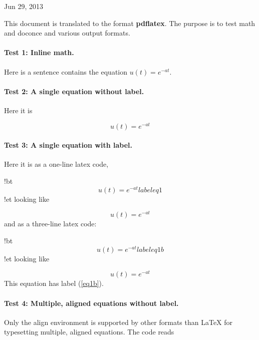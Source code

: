 \documentclass[%
oneside,                 %
final,                   %
10pt]{article}
\begin{document}
\begin{center}
Jun 29, 2013
\end{center}

\vspace{1cm}



This document is translated to the format \textbf{pdflatex}. The purpose is to
test math and doconce and various output formats.

\paragraph{Test 1: Inline math.}
Here is a sentence contains the equation $u(t)=e^{-at}$.

\paragraph{Test 2: A single equation without label.}
Here it is

\[ u(t)=e^{-at} \]

\paragraph{Test 3: A single equation with label.}
Here it is as a one-line
latex code,

\bccq
!bt
\begin{equation} u(t)=e^{-at} label{eq1}\end{equation}
!et
\eccq
looking like

\begin{equation} u(t)=e^{-at} \label{eq1}\end{equation}
and as a three-line latex code:

\bccq
!bt
\begin{equation}
u(t)=e^{-at} label{eq1b}
\end{equation}
!et
\eccq
looking like

\begin{equation}
u(t)=e^{-at} \label{eq1b}
\end{equation}
This equation has label (\ref{eq1b}).


\paragraph{Test 4: Multiple, aligned equations without label.}
Only the align
environment is supported by other formats than {\LaTeX} for typesetting
multiple, aligned equations. The code reads
\end{document}
